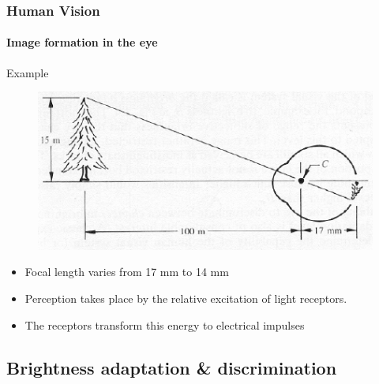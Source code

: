 \documentclass{beamer}
\begin{document}
\begin{frame}
  \frametitle{Human Vision}
  \framesubtitle{Image formation in the eye}
  \begin{block}{Example}
    \begin{figure}
      \centering
      \includegraphics[width=.7\textwidth]{./images/form.png}
    \end{figure}
    \begin{itemize}\scriptsize
    \item Focal length varies from 17 mm to 14 mm
    \item Perception takes place by the relative excitation of light receptors.
    \item The receptors transform this energy to electrical impulses
    \end{itemize}
  \end{block}
\end{frame}

\subsection{Brightness adaptation \& discrimination}
\end{document}
